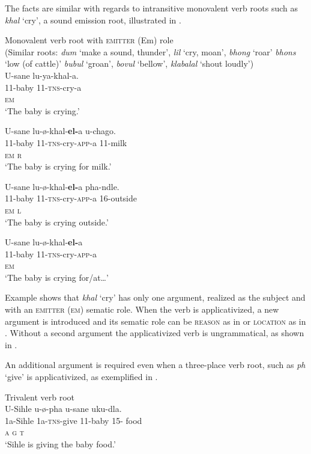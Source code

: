 \documentclass[output=paper]{langsci/langscibook}
\begin{document}
 The facts are similar with regards to intransitive monovalent verb roots such as \textit{khal} ‘cry’, a sound emission root, illustrated in . 

\ea
{Monovalent verb root with \textsc{emitter} (Em) role}\\
 (Similar roots: \textit{dum} ‘make a sound, thunder’, \textit{lil }‘cry, moan’, \textit{bhong} ‘roar’ \textit{bhons} ‘low (of cattle)’ \textit{bubul} ‘groan’, \textit{bovul} ‘bellow’, \textit{klabalal} ‘shout loudly’)\\
\ea
\gll U-sane lu-ya-khal-a.\\
 11-baby 11-\textsc{tns}-cry-a \\
 \textsc{em}\\
\glt ‘The baby is crying.’

\ex
\gll U-sane lu-ø-khal-\textbf{el-}a u-chago. \\
 11-baby 11-\textsc{tns}-cry-\textsc{app}-a 11-milk\\
 \textsc{em r}\\
\glt ‘The baby is crying for milk.’ 

\ex
\gll U-sane lu-ø-khal-\textbf{el-}a pha-ndle.\\
 11-baby 11-\textsc{tns}-cry-\textsc{app}-a 16-outside\\
 \textsc{em l}\\
\glt ‘The baby is crying outside.’


\ex
\gll *U-sane lu-ø-khal-\textbf{el-}a \\
 11-baby 11-\textsc{tns}-cry-\textsc{app}-a \\
 \textsc{em} \\
\glt ‘The baby is crying for/at…’
\z
\z

Example  shows that \textit{khal} ‘cry’ has only one argument, realized as the subject and with an \textsc{emitter} (\textsc{em}) sematic role. When the verb is applicativized, a new argument is introduced and its sematic role can be \textsc{reason} as in  or \textsc{location} as in . Without a second argument the applicativized verb is ungrammatical, as shown in .

 An additional argument is required even when a three-place verb root, such as \textit{ph} ‘give’ is applicativized, as exemplified in . 

\ea
{Trivalent verb root}\\

\ea
\gll U-Sihle u-ø-pha u-sane uku-dla. \\
 1a-Sihle 1a-\textsc{tns}-give 11-baby 15- food \\
 \textsc{a g t}\\
\glt ‘Sihle is giving the baby food.’
\end{document}
